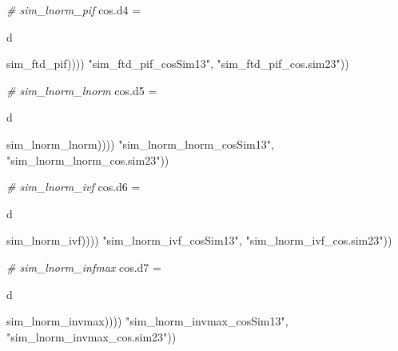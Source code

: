 \documentclass[10pt]{report}
\newenvironment{Shaded}{}{}
\newcommand{\KeywordTok}[1]{\textcolor[rgb]{0.00,0.44,0.13}{\textbf{{#1}}}}
\newcommand{\DecValTok}[1]{\textcolor[rgb]{0.25,0.63,0.44}{{#1}}}
\newcommand{\StringTok}[1]{\textcolor[rgb]{0.25,0.44,0.63}{{#1}}}
\newcommand{\CommentTok}[1]{\textcolor[rgb]{0.38,0.63,0.69}{\textit{{#1}}}}
\newcommand{\NormalTok}[1]{{#1}}
\begin{document}
\begin{Shaded}
\begin{Highlighting}[]
{{{{{{{\CommentTok{# sim_lnorm_pif}
\NormalTok{cos.d4 =}\StringTok{ }\NormalTok{d %>%}\StringTok{ }\KeywordTok{select}\NormalTok{(orderID) %>%}\StringTok{ }\KeywordTok{cbind}\NormalTok{(}\KeywordTok{t}\NormalTok{(}\KeywordTok{sapply}\NormalTok{(}\DecValTok{1}\NormalTok{:}\KeywordTok{nrow}\NormalTok{(dmcsucks), function(i) }\KeywordTok{CosSimSummary}\NormalTok{(i, }
    \NormalTok{sim_ftd_pif)))) %>%}\StringTok{ }\NormalTok{data.frame %>%}\StringTok{ }\KeywordTok{renm}\NormalTok{(}\KeywordTok{c}\NormalTok{(}\StringTok{"orderID"}\NormalTok{, }\StringTok{"sim_ftd_pif_cosSim12"}\NormalTok{, }
    \StringTok{"sim_ftd_pif_cosSim13"}\NormalTok{, }\StringTok{"sim_ftd_pif_cos.sim23"}\NormalTok{))}

\CommentTok{# sim_lnorm_lnorm}
\NormalTok{cos.d5 =}\StringTok{ }\NormalTok{d %>%}\StringTok{ }\KeywordTok{select}\NormalTok{(orderID) %>%}\StringTok{ }\KeywordTok{cbind}\NormalTok{(}\KeywordTok{t}\NormalTok{(}\KeywordTok{sapply}\NormalTok{(}\DecValTok{1}\NormalTok{:}\KeywordTok{nrow}\NormalTok{(dmcsucks), function(i) }\KeywordTok{CosSimSummary}\NormalTok{(i, }
    \NormalTok{sim_lnorm_lnorm)))) %>%}\StringTok{ }\NormalTok{data.frame %>%}\StringTok{ }\KeywordTok{renm}\NormalTok{(}\KeywordTok{c}\NormalTok{(}\StringTok{"orderID"}\NormalTok{, }\StringTok{"sim_lnorm_lnorm_cosSim12"}\NormalTok{, }
    \StringTok{"sim_lnorm_lnorm_cosSim13"}\NormalTok{, }\StringTok{"sim_lnorm_lnorm_cos.sim23"}\NormalTok{))}

\CommentTok{# sim_lnorm_ivf}
\NormalTok{cos.d6 =}\StringTok{ }\NormalTok{d %>%}\StringTok{ }\KeywordTok{select}\NormalTok{(orderID) %>%}\StringTok{ }\KeywordTok{cbind}\NormalTok{(}\KeywordTok{t}\NormalTok{(}\KeywordTok{sapply}\NormalTok{(}\DecValTok{1}\NormalTok{:}\KeywordTok{nrow}\NormalTok{(dmcsucks), function(i) }\KeywordTok{CosSimSummary}\NormalTok{(i, }
    \NormalTok{sim_lnorm_ivf)))) %>%}\StringTok{ }\NormalTok{data.frame %>%}\StringTok{ }\KeywordTok{renm}\NormalTok{(}\KeywordTok{c}\NormalTok{(}\StringTok{"orderID"}\NormalTok{, }\StringTok{"sim_lnorm_ivf_cosSim12"}\NormalTok{, }
    \StringTok{"sim_lnorm_ivf_cosSim13"}\NormalTok{, }\StringTok{"sim_lnorm_ivf_cos.sim23"}\NormalTok{))}

\CommentTok{# sim_lnorm_infmax}
\NormalTok{cos.d7 =}\StringTok{ }\NormalTok{d %>%}\StringTok{ }\KeywordTok{select}\NormalTok{(orderID) %>%}\StringTok{ }\KeywordTok{cbind}\NormalTok{(}\KeywordTok{t}\NormalTok{(}\KeywordTok{sapply}\NormalTok{(}\DecValTok{1}\NormalTok{:}\KeywordTok{nrow}\NormalTok{(dmcsucks), function(i) }\KeywordTok{CosSimSummary}\NormalTok{(i, }
    \NormalTok{sim_lnorm_invmax)))) %>%}\StringTok{ }\NormalTok{data.frame %>%}\StringTok{ }\KeywordTok{renm}\NormalTok{(}\KeywordTok{c}\NormalTok{(}\StringTok{"orderID"}\NormalTok{, }\StringTok{"sim_lnorm_invmax_cosSim12"}\NormalTok{, }
    \StringTok{"sim_lnorm_invmax_cosSim13"}\NormalTok{, }\StringTok{"sim_lnorm_invmax_cos.sim23"}\NormalTok{))}

}}}}}}}}}}}}}}}
\end{Highlighting}
\end{Shaded}
\end{document}
